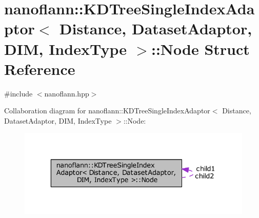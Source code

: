 \hypertarget{structnanoflann_1_1_k_d_tree_single_index_adaptor_1_1_node}{\section{nanoflann\-:\-:K\-D\-Tree\-Single\-Index\-Adaptor$<$ Distance, Dataset\-Adaptor, D\-I\-M, Index\-Type $>$\-:\-:Node Struct Reference}
\label{structnanoflann_1_1_k_d_tree_single_index_adaptor_1_1_node}
}


{\ttfamily \#include $<$nanoflann.\-hpp$>$}



Collaboration diagram for nanoflann\-:\-:K\-D\-Tree\-Single\-Index\-Adaptor$<$ Distance, Dataset\-Adaptor, D\-I\-M, Index\-Type $>$\-:\-:Node\-:
\nopagebreak
\begin{figure}[H]
\begin{center}
\leavevmode
\includegraphics[width=329pt]{structnanoflann_1_1_k_d_tree_single_index_adaptor_1_1_node__coll__graph}
\end{center}
\end{figure}
